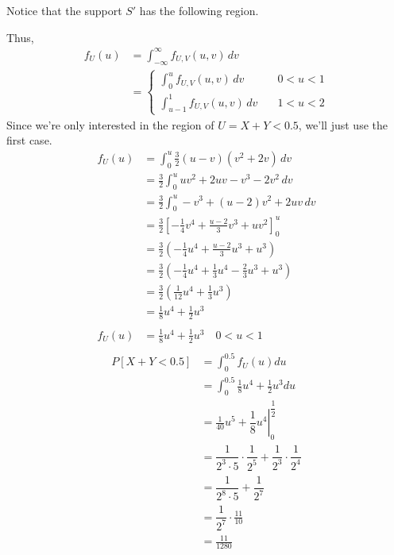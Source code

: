 \documentclass[11pt]{article}
\begin{document}
    Notice that the support $S'$ has the following region. 
    \begin{center}
    \end{center}
    Thus, 
    \begin{align*}
        f_{U}(u) &= \int_{-\infty}^{\infty}f_{U, V}(u, v)\,dv \\ 
        &= \begin{cases}
            \int_{0}^{u} f_{U, V}(u, v)\,dv \quad & 0<u<1 \\
            \int_{u-1}^{1} f_{U, V}(u, v)\,dv  \quad & 1<u<2
        \end{cases}
    \end{align*}
    Since we're only interested in the region of $U=X+Y < 0.5$, we'll just use
    the first case.
    \begin{align*}
        f_U(u) &= \int_{0}^{u} \frac{3}{2} (u - v) (v^2 + 2v)\, dv \\
        &= \frac{3}{2} \int_{0}^{u} uv^2 + 2uv - v^3 - 2v^2\, dv \\
        &= \frac{3}{2} \int_{0}^{u} - v^3 + (u-2)v^2 + 2uv\, dv \\
        &= \frac{3}{2} \left[- \frac{1}{4}v^4 + \frac{u-2}{3}v^3 + uv^2\right]^{u}_{0}\\
        &= \frac{3}{2} \left(- \frac{1}{4}u^4 + \frac{u-2}{3}u^3 + u^3 \right)\\ 
        &= \frac{3}{2} \left(- \frac{1}{4}u^4 + \frac{1}{3}u^4 - \frac{2}{3} u^3 + u^3 \right)\\ 
        &= \frac{3}{2} \left(\frac{1}{12}u^4 + \frac{1}{3} u^3  \right)\\ 
        &= \frac{1}{8}u^4 + \frac{1}{2} u^3 \\ 
        \\
        f_U(u) &= \frac{1}{8}u^4 + \frac{1}{2} u^3  \quad 0 < u < 1 \\
    \end{align*}
    \begin{align*}
        P[X+Y < 0.5] &= \int_{0}^{0.5} f_U(u) du \\ 
        &= \int_{0}^{0.5} \frac{1}{8}u^4 + \frac{1}{2} u^3 du  \\ 
        &= \left.\frac{1}{40}u^{5} + \dfrac{1}{8}u^4 \right|_{0}^{\dfrac{1}{2}} \\ 
        &= \dfrac{1}{2^{3}\cdot 5} \cdot \dfrac{1}{2^{5}} + \dfrac{1}{2^{3}}\cdot \dfrac{1}{2^{4}} \\ 
        &= \dfrac{1}{2^{8}\cdot 5} + \dfrac{1}{2^{7}} \\ 
        &= \dfrac{1}{2^{7}} \cdot \frac{11}{10} \\ 
        &= \frac{11}{1280}
    \end{align*}
\end{document}

